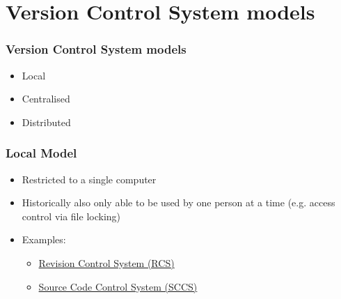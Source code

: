 \documentclass{git_course}
\begin{document}
\appendix

\section{Version Control System models}

\begin{frame}
    \frametitle{Version Control System models}
    \begin{itemize}
        \item Local
        \item Centralised
        \item Distributed
    \end{itemize}
\end{frame}

\begin{frame}
\frametitle{Local Model}
\begin{itemize}
    \item Restricted to a single computer
    \item Historically also only able to be used by one person at a time
        (e.g. access control via file locking)
    \item Examples:
        \begin{itemize}
            \item \href{https://en.wikipedia.org/wiki/Revision_Control_System}
                       {Revision Control System (RCS)}
            \item \href{https://en.wikipedia.org/wiki/Source_Code_Control_System}
                       {Source Code Control System (SCCS)}
        \end{itemize}
\end{itemize}
\end{frame}
\end{document}
